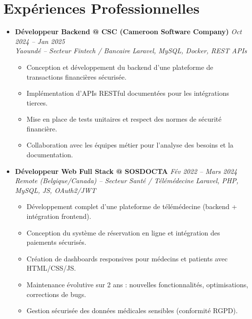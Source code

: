 \documentclass[a4paper,11pt]{article}
\begin{document}
\section{Expériences Professionnelles}
\begin{itemize}[leftmargin=*, label={-}]

\item \textbf{Développeur Backend @ CSC (Cameroon Software Company)} \hfill \textit{Oct 2024 -- Jan 2025} \\
\textit{Yaoundé -- Secteur Fintech / Bancaire} \hfill \textit{Laravel, MySQL, Docker, REST APIs}
\vspace{-2pt}
    \begin{itemize}[leftmargin=0.4cm, nosep, label=\tiny$\bullet$]
        \item \small{Conception et développement du backend d'une plateforme de transactions financières sécurisée.}
        \item \small{Implémentation d'APIs RESTful documentées pour les intégrations tierces.}
        \item \small{Mise en place de tests unitaires et respect des normes de sécurité financière.}
        \item \small{Collaboration avec les équipes métier pour l'analyse des besoins et la documentation.}
    \end{itemize}
\vspace{3pt}

\item \textbf{Développeur Web Full Stack @ SOSDOCTA} \hfill \textit{Fév 2022 -- Mars 2024} \\
\textit{Remote (Belgique/Canada) -- Secteur Santé / Télémédecine} \hfill \textit{Laravel, PHP, MySQL, JS, OAuth2/JWT}
\vspace{-2pt}
    \begin{itemize}[leftmargin=0.4cm, nosep, label=\tiny$\bullet$]
        \item \small{Développement complet d'une plateforme de télémédecine (backend + intégration frontend).}
        \item \small{Conception du système de réservation en ligne et intégration des paiements sécurisés.}
        \item \small{Création de dashboards responsives pour médecins et patients avec HTML/CSS/JS.}
        \item \small{Maintenance évolutive sur 2 ans : nouvelles fonctionnalités, optimisations, corrections de bugs.}
        \item \small{Gestion sécurisée des données médicales sensibles (conformité RGPD).}
    \end{itemize}
\vspace{3pt}


\end{itemize}
\end{document}
